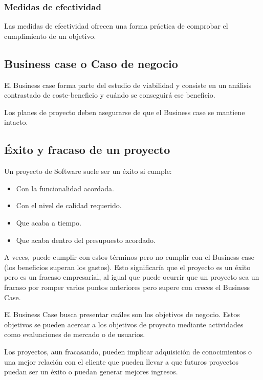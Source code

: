 \documentclass[12pt]{article}
\begin{document}
\subsubsection{Medidas de efectividad}
\label{1.10.2}

{Las medidas de efectividad ofrecen una forma práctica de comprobar el cumplimiento de un objetivo.}

\subsection{Business case o Caso de negocio}
\label{1.11.0}

{El Business case forma parte del estudio de viabilidad y consiste en un análisis contrastado de coste-beneficio y cuándo se conseguirá ese beneficio.} \bigskip

{Los planes de proyecto deben asegurarse de que el Business case se mantiene intacto.}

\subsection{Éxito y fracaso de un proyecto}
\label{1.12.0}

{Un proyecto de Software suele ser un éxito si cumple:}

\begin{itemize}
    \item {Con la funcionalidad acordada.}
    \item {Con el nivel de calidad requerido.}
    \item {Que acaba a tiempo.}
    \item {Que acaba dentro del presupuesto acordado.}
\end{itemize}

{A veces, puede cumplir con estos términos pero no cumplir con el Business case (los beneficios superan los gastos). Esto significaría que el proyecto es un éxito pero es un fracaso empresarial, al igual que puede ocurrir que un proyecto sea un fracaso por romper varios puntos anteriores pero supere con creces el Business Case.} \bigskip

{El Business Case busca presentar cuáles son los objetivos de negocio. Estos objetivos se pueden acercar a los objetivos de proyecto mediante actividades como evaluaciones de mercado o de usuarios.} \bigskip

{Los proyectos, aun fracasando, pueden implicar adquisición de conocimientos o una mejor relación con el cliente que pueden llevar a que futuros proyectos puedan ser un éxito o puedan generar mejores ingresos.}
\end{document}
